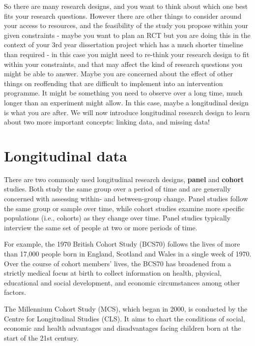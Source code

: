 \documentclass[
]{book}
\begin{document}
So there are many research designs, and you want to think about which one best fits your research questions. However there are other things to consider around your access to resources, and the feasibility of the study you propose within your given constraints - maybe you want to plan an RCT but you are doing this in the context of your 3rd year dissertation project which has a much shorter timeline than required - in this case you might need to re-think your research design to fit within your constraints, and that may affect the kind of research questions you might be able to answer. Maybe you are concerned about the effect of other things on reoffending that are difficult to implement into an intervention programme. It might be something you need to observe over a long time, much longer than an experiment might allow. In this case, maybe a longitudinal design is what you are after. We will now introduce longitudinal research design to learn about two more important concepts: linking data, and missing data!

\hypertarget{longitudinal-data}{%
\section{Longitudinal data}\label{longitudinal-data}}

There are two commonly used longitudinal research designs, \textbf{panel} and \textbf{cohort} studies. Both study the same group over a period of time and are generally concerned with assessing within- and between-group change. Panel studies follow the same group or sample over time, while cohort studies examine more specific populations (i.e., cohorts) as they change over time. Panel studies typically interview the same set of people at two or more periods of time.

For example, the 1970 British Cohort Study (BCS70) follows the lives of more than 17,000 people born in England, Scotland and Wales in a single week of 1970. Over the course of cohort members' lives, the BCS70 has broadened from a strictly medical focus at birth to collect information on health, physical, educational and social development, and economic circumstances among other factors.

The Millennium Cohort Study (MCS), which began in 2000, is conducted by the Centre for Longitudinal Studies (CLS). It aims to chart the conditions of social, economic and health advantages and disadvantages facing children born at the start of the 21st century.
\end{document}
